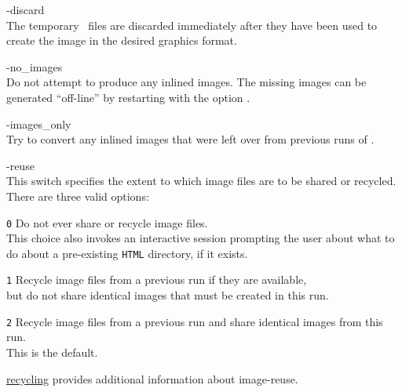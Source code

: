 \begin{htmllist}
%
\begin{changebar}
\item [ -discard\label{discard}]
\\
The temporary \PS\ files are discarded immediately after they
have been used to create the image in the desired graphics format.
\end{changebar}

%
\item [ -no\_images\label{noimages}]
\\
Do not attempt to produce any inlined images. 
The missing images can be generated ``off-line'' by restarting \latextohtml{}
with the option .

%
\item [ -images\_only\label{imagesonly}]
\\
Try to convert any inlined images that were left over from previous
runs of \latextohtml. 


%
\begin{changebar} 
\item [ -reuse \Meta{reuse\_option}\label{reuseoptions}]
\\
This switch specifies the extent to which image files are to be shared
or recycled.\html{\\}
There are three valid options:
%
\begin{htmllist}
%
\item [\texttt{0}] 
Do not ever share or recycle image files.\\
This choice also invokes an interactive session 
prompting the user about what to do about
a pre-existing \texttt{HTML} directory, if it exists.
%
%
\item [\texttt{1}] 
Recycle image files from a previous run if they are available,\\
but do not share identical images that must be created in this run.
%
%
\item [\texttt{2}] 
Recycle image files from a previous run and share identical
images from this run.\\
This is the default.
\end{htmllist}
\hyperref{A later section}{Section~}{}{recycling} provides 
additional information about image-reuse.



\end{changebar}
\end{htmllist}
